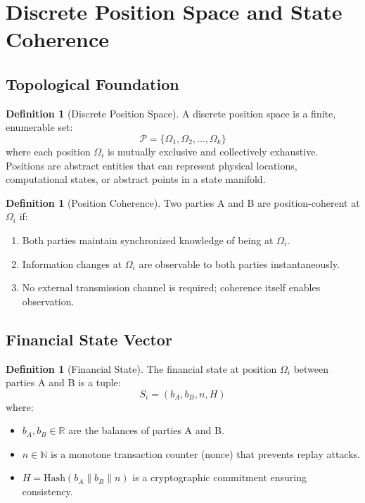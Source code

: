 \documentclass[twocolumn,10pt,a4paper]{article}
\theoremstyle{plain}
\theoremstyle{definition}
\newtheorem{definition}[theorem]{Definition}
\begin{document}
\section{Discrete Position Space and State Coherence}
\label{sec:model}

\subsection{Topological Foundation}

\begin{definition}[Discrete Position Space]
A discrete position space is a finite, enumerable set:
\[
\mathcal{P} = \{\Omega_1, \Omega_2, \ldots, \Omega_k\}
\]
where each position $\Omega_i$ is mutually exclusive and collectively exhaustive. Positions are abstract entities that can represent physical locations, computational states, or abstract points in a state manifold.
\end{definition}

\begin{definition}[Position Coherence]
Two parties A and B are position-coherent at $\Omega_i$ if:
\begin{enumerate}
\item Both parties maintain synchronized knowledge of being at $\Omega_i$.
\item Information changes at $\Omega_i$ are observable to both parties instantaneously.
\item No external transmission channel is required; coherence itself enables observation.
\end{enumerate}
\end{definition}

\subsection{Financial State Vector}

\begin{definition}[Financial State]
The financial state at position $\Omega_i$ between parties A and B is a tuple:
\[
S_i = (b_A, b_B, n, H)
\]
where:
\begin{itemize}
\item $b_A, b_B \in \mathbb{R}$ are the balances of parties A and B.
\item $n \in \mathbb{N}$ is a monotone transaction counter (nonce) that prevents replay attacks.
\item $H = \mathrm{Hash}(b_A \| b_B \| n)$ is a cryptographic commitment ensuring consistency.
\end{itemize}
\end{definition}
\end{document}
